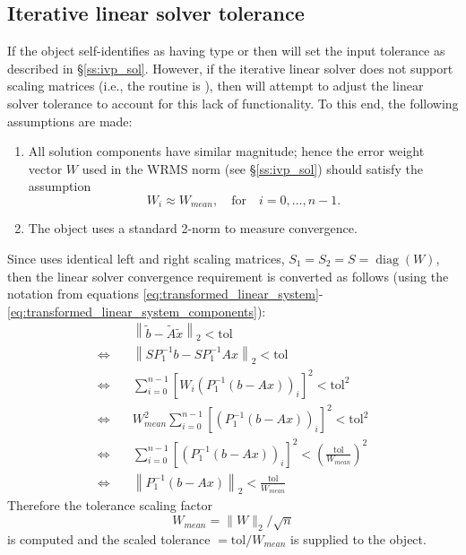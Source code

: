 \subsection{Iterative linear solver tolerance}
\label{ss:sunlinsol_iterative_tolerance}

If the {\sunlinsol} object self-identifies as having type
 or \newline
{} then {\cvls} will set the input
tolerance  as described in \S\ref{ss:ivp_sol}. However, if the
iterative linear solver does not support scaling matrices (i.e., the \newline
{} routine is ), then {\cvls} will attempt 
to adjust the linear solver tolerance to account for this lack of functionality.
To this end, the following assumptions are made:
\begin{enumerate}
\item All solution components have similar magnitude; hence the error
  weight vector $W$ used in the WRMS norm (see \S\ref{ss:ivp_sol})
  should satisfy the assumption 
  \[
    W_i \approx W_{mean},\quad \text{for}\quad i=0,\ldots,n-1.
  \]
\item The {\sunlinsol} object uses a standard 2-norm to measure
  convergence.
\end{enumerate}

Since {\cvode} uses identical left and right scaling matrices,
$S_1 = S_2 = S = \operatorname{diag}(W)$, then the linear
solver convergence requirement is converted as follows
(using the notation from equations
\eqref{eq:transformed_linear_system}-\eqref{eq:transformed_linear_system_components}):
\begin{align*}
  &\left\| \tilde{b} - \tilde{A} \tilde{x} \right\|_2  <  \text{tol}\\
  \Leftrightarrow \quad & \left\| S P_1^{-1} b - S P_1^{-1} A x \right\|_2  <  \text{tol}\\
  \Leftrightarrow \quad & \sum_{i=0}^{n-1} \left[W_i \left(P_1^{-1} (b - A x)\right)_i\right]^2  <  \text{tol}^2\\
  \Leftrightarrow \quad & W_{mean}^2 \sum_{i=0}^{n-1} \left[\left(P_1^{-1} (b - A x)\right)_i\right]^2  <  \text{tol}^2\\
  \Leftrightarrow \quad & \sum_{i=0}^{n-1} \left[\left(P_1^{-1} (b - A x)\right)_i\right]^2  <  \left(\frac{\text{tol}}{W_{mean}}\right)^2\\
  \Leftrightarrow \quad & \left\| P_1^{-1} (b - A x)\right\|_2  <  \frac{\text{tol}}{W_{mean}}
\end{align*}
Therefore the tolerance scaling factor
\[
  W_{mean} = \|W\|_2 / \sqrt{n}
\]
is computed and the scaled tolerance $= \text{tol} / W_{mean}$ is
supplied to the {\sunlinsol} object.

